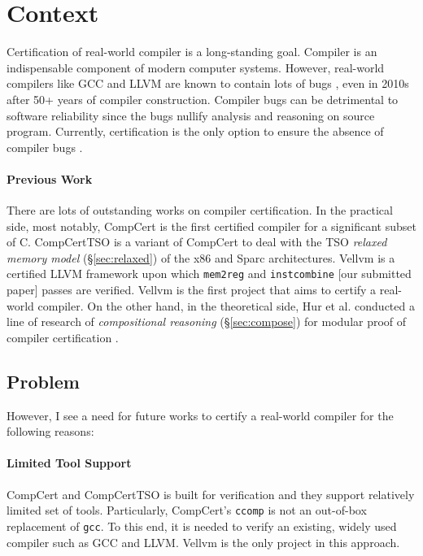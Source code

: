 \documentclass[nocopyrightspace]{sigplanconf}
\begin{document}
\section{Context}
Certification of real-world compiler is a long-standing goal.
Compiler is an indispensable component of modern computer systems.
However, real-world compilers like GCC and LLVM are known to contain
lots of bugs \cite{Yang:2011:FUB:1993498.1993532,
  Chen:2013:TCF:2491956.2462173}, even in 2010s after 50+ years of
compiler construction.  Compiler bugs can be detrimental to software
reliability since the bugs nullify analysis and reasoning on source
program.  Currently, certification is the only option to ensure the
absence of compiler bugs \cite{Yang:2011:FUB:1993498.1993532}.

\paragraph{Previous Work}
There are lots of outstanding works on compiler certification.  In the
practical side, most notably, CompCert \cite{Leroy-Compcert-CACM} is
the first certified compiler for a significant subset of C.
CompCertTSO \cite{Sevcik:2013:CVC:2487241.2487248} is a variant of
CompCert to deal with the TSO \emph{relaxed memory model}
(\S\ref{sec:relaxed}) of the x86 and Sparc architectures.  Vellvm
\cite{Zhao:2012:FLI:2103656.2103709} is a certified LLVM framework
upon which \texttt{mem2reg} \cite{Zhao:2013:FVS:2491956.2462164} and
\texttt{instcombine} [our submitted paper] passes are verified.
Vellvm is the first project that aims to certify a real-world
compiler.  On the other hand, in the theoretical side, Hur et
al. conducted a line of research of \emph{compositional reasoning}
(\S\ref{sec:compose}) for modular proof of compiler certification
\cite{Hur:2012:MBK:2103656.2103666}.

\subsection{Problem}
However, I see a need for future works to certify a real-world
compiler for the following reasons:

\paragraph{Limited Tool Support} 
CompCert and CompCertTSO is built for verification and they support
relatively limited set of tools.  Particularly, CompCert's
\texttt{ccomp} is not an out-of-box replacement of \texttt{gcc}.  To
this end, it is needed to verify an existing, widely used compiler
such as GCC and LLVM.  Vellvm is the only project in this approach.
\end{document}
